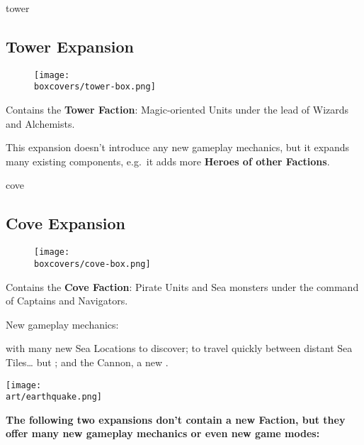 \begin{multicols}{2}
\begin{expansion}[title=]{tower}
  \subsection*{\color{tower}Tower Expansion}
  \setlength\intextsep{0pt}
  \setlength\columnsep{0.8em}
  \begin{wrapfigure}{l}{0.35\textwidth}
    \texttt{[image: \\boxcovers/tower-box.png]}
  \end{wrapfigure}
  Contains the \textbf{Tower Faction}: Magic-oriented Units under the lead of Wizards and Alchemists.\par
  \medskip
  This expansion doesn't introduce any new gameplay mechanics, but it expands many existing components, e.g.~it adds more \textbf{Heroes of other Factions}.
\end{expansion}
\vspace*{\fill}
\columnbreak

\begin{expansion}[title=]{cove}
  \subsection*{\color{cove}Cove Expansion}
  \setlength\intextsep{0pt}
  \setlength\columnsep{0.8em}
  \begin{wrapfigure}{l}{0.35\textwidth}
    \texttt{[image: \\boxcovers/cove-box.png]}
  \end{wrapfigure}
  Contains the \textbf{Cove Faction}: Pirate Units and Sea monsters under the command of Captains and Navigators.\par
  \medskip
  New gameplay mechanics:\par
  \smallskip
   with many new Sea Locations to discover;  to travel quickly between distant Sea Tiles… but ; and the Cannon, a new .
\end{expansion}

\begin{center}
\hfill{}\texttt{[image: \\art/earthquake.png]}
\end{center}

\end{multicols}

\textbf{The following two expansions don't contain a new Faction, but they offer many new gameplay mechanics or even new game modes:}


